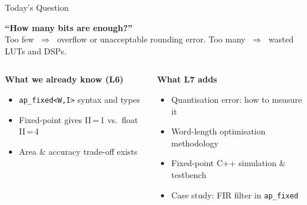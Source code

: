 \documentclass[aspectratio=169,12pt]{beamer}
\begin{document}
\begin{frame}[t]{Today's Question}
\vspace{0.07cm}
\begin{center}
  \colorbox{NavyDk}{\parbox{0.82\textwidth}{%
    \vspace{4pt}
    \centering
    {\color{white}\fontsize{18}{22}\selectfont\bfseries
      ``How many bits are enough?''}\\[1pt]
    {\color{LtGray}\fontsize{10}{13}\selectfont
      Too few $\;\Rightarrow\;$ overflow or unacceptable rounding error.\quad
      Too many $\;\Rightarrow\;$ wasted LUTs and DSPs.}
    \vspace{4pt}
  }}
\end{center}
\vspace{0.11cm}
\begin{columns}[T,totalwidth=\textwidth]
  \colorbox{Orange!10}{\parbox{\dimexpr\linewidth-2\fboxsep\relax}{%
    \vspace{2pt}
    {\color{Orange}\bfseries What we already know (L6)}\\[1pt]
    {\footnotesize\color{Navy}
    \begin{itemize}\setlength{\itemsep}{1pt}
      \item \texttt{ap\_fixed<W,I>} syntax and types
      \item Fixed-point gives II\,=\,1 vs.\ float II\,=\,4
      \item Area \& accuracy trade-off exists
    \end{itemize}}
    \vspace{1pt}
  }}
  \colorbox{Teal!10}{\parbox{\dimexpr\linewidth-2\fboxsep\relax}{%
    \vspace{2pt}
    {\color{Teal}\bfseries What L7 adds}\\[1pt]
    {\footnotesize\color{Navy}
    \begin{itemize}\setlength{\itemsep}{1pt}
      \item Quantisation error: how to measure it
      \item Word-length optimisation methodology
      \item Fixed-point C++ simulation \& testbench
      \item Case study: FIR filter in \texttt{ap\_fixed}
    \end{itemize}}
    \vspace{1pt}
  }}
\end{columns}
\end{frame}
\end{document}
